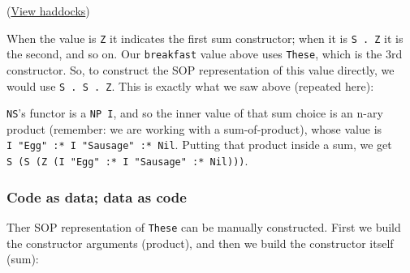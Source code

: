 (\href{https://hackage.haskell.org/package/sop-core-0.5.0.2/docs/Data-SOP.html\#t:NS}{View
haddocks})

When the value is \texttt{Z} it indicates the first sum constructor;
when it is \texttt{S\ .\ Z} it is the second, and so on. Our
\texttt{breakfast} value above uses \texttt{These}, which is the 3rd
constructor. So, to construct the SOP representation of this value
directly, we would use \texttt{S\ .\ S\ .\ Z}. This is exactly what we
saw above (repeated here):

\begin{Shaded}
\begin{Highlighting}[]
\OperatorTok{\textgreater{}}\OperatorTok{$}
\NormalTok{ (}\NormalTok{ (}\NormalTok{ (}  \OperatorTok{:*}   \OperatorTok{:*} \NormalTok{)))}
\OperatorTok{\textgreater{}}
\OperatorTok{\textgreater{}} \OperatorTok{:}\OperatorTok{$}
\OperatorTok{$}
\OtherTok{  ::} \NormalTok{ (} \NormalTok{) \textquotesingle{}[ [}\NormalTok{], [}\NormalTok{], [}\NormalTok{, }\NormalTok{] ]}
\end{Highlighting}
\end{Shaded}

\texttt{NS}'s functor is a \texttt{NP\ I}, and so the inner value of
that sum choice is an n-ary product (remember: we are working with a
sum-of-product), whose value is
\texttt{I\ "Egg"\ :*\ I\ "Sausage"\ :*\ Nil}. Putting that product
inside a sum, we get
\texttt{S\ (S\ (Z\ (I\ "Egg"\ :*\ I\ "Sausage"\ :*\ Nil)))}.

\hypertarget{code-as-data-data-as-code}{%
\subsubsection{Code as data; data as
code}\label{code-as-data-data-as-code}}

Ther SOP representation of \texttt{These} can be manually constructed.
First we build the constructor arguments (product), and then we build
the constructor itself (sum):

